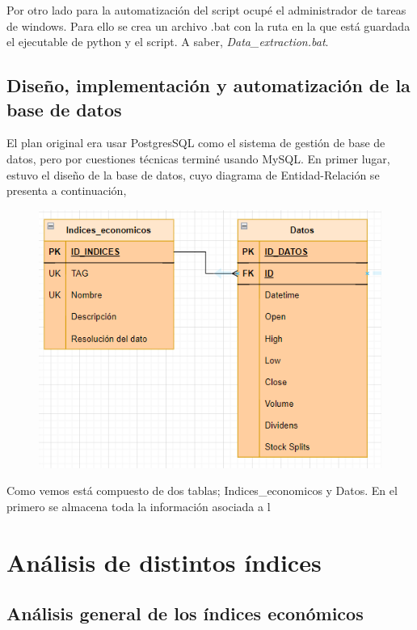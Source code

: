 \documentclass[10pt,a4paper]{article}
\begin{document}
	Por otro lado para la automatización del script ocupé el administrador de tareas de windows. Para ello se crea un archivo .bat con la ruta en la que está guardada el ejecutable de python y el script. A saber, \textit{Data{\_}extraction.bat}.
	
		\subsection{Diseño, implementación y automatización de la base de datos}
	
	El plan original era usar PostgresSQL como el sistema de gestión de base de datos, pero por cuestiones técnicas terminé usando MySQL. En primer lugar, estuvo el diseño de la base de datos, cuyo diagrama de Entidad-Relación se presenta a continuación,
	
\begin{figure}[h]
  \centering
  \includegraphics[scale=0.7]{Base_de_datos.PNG} 
\end{figure}	

	Como vemos está compuesto de dos tablas; Indices{\_}economicos y Datos. En el primero se almacena toda la información asociada a l
	
	
\section{Análisis de distintos índices}
	
	\subsection{Análisis general de los índices económicos}	
	
\end{document}
